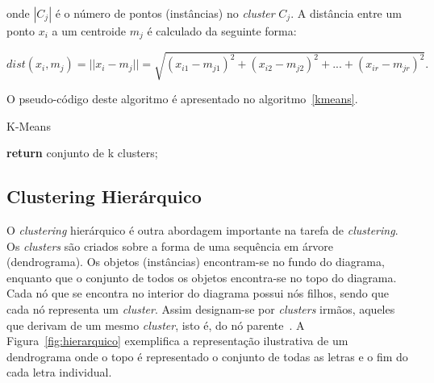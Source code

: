 onde $ |C_{j}| $ é o número de pontos (instâncias) no \textit{cluster} $ C_{j} $. A distância entre um ponto $ x_{i} $ a um centroide $ m_{j} $ é calculado da seguinte forma:

\begin{equation}
dist(x_{i}, m_{j}) = ||x_{i} - m_{j}|| =  \sqrt{(x_{i1} - m_{j1})^2 + (x_{i2} - m_{j2})^2 + ... + (x_{ir} - m_{jr})^2} .
\end{equation}

O pseudo-código deste algoritmo é apresentado no algoritmo~\ref{kmeans}.

\begin{algorithm}
\caption{K-Means}\label{kmeans}
\begin{algorithmic}[1]
	\Repeat 
	\State \textbf{return} {conjunto de k clusters;}
\EndProcedure 
\end{algorithmic}
\end{algorithm}


\subsection{Clustering Hierárquico} \label{subsec:hierar}

O \textit{clustering} hierárquico é outra abordagem importante na tarefa de \textit{clustering}. Os \textit{clusters} são criados sobre a forma de uma sequência em árvore (dendrograma). Os objetos (instâncias) encontram-se no fundo do diagrama, enquanto que o conjunto de todos os objetos encontra-se no topo do diagrama. Cada nó que se encontra no interior do diagrama possui nós filhos, sendo que cada nó representa um \textit{cluster}. Assim designam-se por \textit{clusters} irmãos, aqueles que derivam de um mesmo \textit{cluster}, isto é, do nó parente~\citet{Liu2011}. A Figura~\ref{fig:hierarquico} exemplifica a representação ilustrativa de um dendrograma onde o topo é representado o conjunto de todas as letras e o fim do cada letra individual. 

